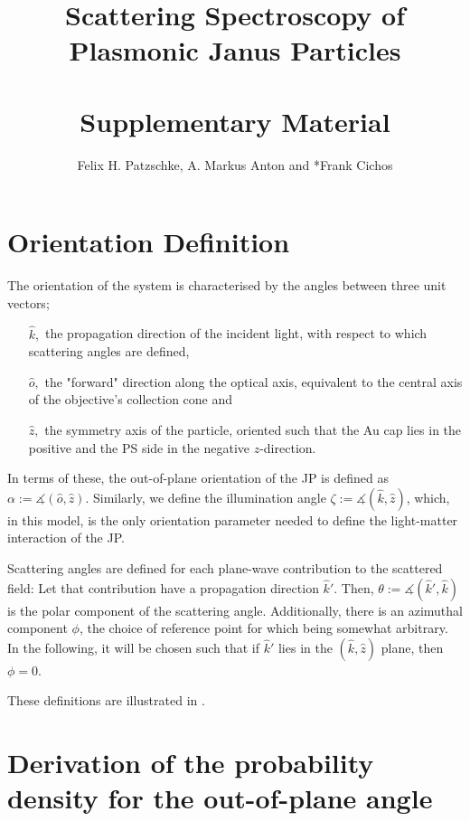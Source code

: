 \documentclass[10pt]{article}
\title{\sffamily\bfseries\color{MidnightBlue} Scattering Spectroscopy of\\Plasmonic Janus Particles\\\mbox{ }\\Supplementary Material}
\author{Felix H. Patzschke, A. Markus Anton and *Frank Cichos}
\date{}
\begin{document}

\maketitle

\sectionfont{\sffamily\color{MidnightBlue}}  %
\subsectionfont{\sffamily\color{MidnightBlue}}  %



\section*{Orientation Definition}
The orientation of the system is characterised by the angles between three unit vectors;
\begin{itemize}
    \item[$\hat{k},$] the propagation direction of the incident light, with respect to which scattering angles are defined, 
    \item[$\hat{o},$] the "forward" direction along the optical axis, equivalent to the central axis of the objective's collection cone and
    \item[$\hat{z},$] the symmetry axis of the particle, oriented such that the Au cap lies in the positive and the PS side in the negative $z$-direction.
\end{itemize}
In terms of these, the out-of-plane orientation of the JP is defined as
$\alpha := \measuredangle( \hat{o}, \hat{z} )$.
Similarly, we define the illumination angle 
$\zeta := \measuredangle( \hat{k}, \hat{z} )$, 
which, in this model, is the only orientation parameter needed to define the light-matter interaction of the JP. 

Scattering angles are defined for each plane-wave contribution to the scattered field: 
Let that contribution have a propagation direction $\hat{k}'$. 
Then, \mbox{$\theta := \measuredangle( \hat{k}', \hat{k} )$} is the polar component of the scattering angle. 
Additionally, there is an azimuthal component $\phi$, the choice of reference point for which being somewhat arbitrary. 
In the following, it will be chosen such that if $\hat{k}'$ lies in the $(\hat{k},\hat{z})$ plane, then $\phi=0$.

These definitions are illustrated in .  




\section*{Derivation of the probability density for the out-of-plane angle}
\end{document}
